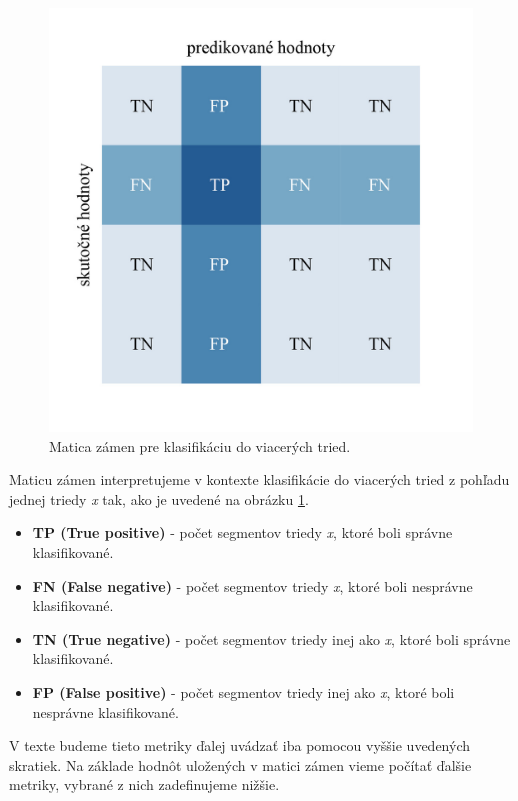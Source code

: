 \begin{figure}[H]
    \centering    
    \includegraphics[scale=0.22]{img/confusion_martix.jpg}
    \caption{Matica zámen pre klasifikáciu do viacerých tried.}
    \label{fig:confusion_matrix}
\end{figure}

\noindent Maticu zámen interpretujeme v kontexte klasifikácie do viacerých tried z pohľadu jednej triedy \textit{x} tak, ako je uvedené na obrázku \ref{fig:confusion_matrix}.

\begin{itemize}
    \item \textbf{TP (True positive)} - počet segmentov triedy \textit{x}, ktoré boli správne klasifikované.
    \item \textbf{FN (False negative)} - počet segmentov triedy \textit{x}, ktoré boli nesprávne klasifikované.
    \item \textbf{TN (True negative)} - počet segmentov triedy inej ako \textit{x}, ktoré boli správne klasifikované.
    \item \textbf{FP (False positive)} - počet segmentov triedy inej ako \textit{x}, ktoré boli nesprávne klasifikované.
\end{itemize}

V texte budeme tieto metriky ďalej uvádzať iba pomocou vyššie uvedených skratiek. Na základe hodnôt uložených v matici zámen vieme počítať ďalšie metriky, vybrané z nich zadefinujeme nižšie.

